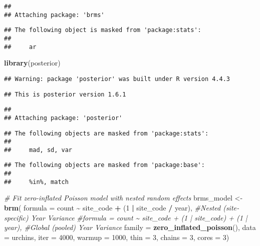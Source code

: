 \documentclass[
]{article}
\newenvironment{Shaded}{\begin{snugshade}}{\end{snugshade}}
\newcommand{\AttributeTok}[1]{\textcolor[rgb]{0.13,0.29,0.53}{#1}}
\newcommand{\CommentTok}[1]{\textcolor[rgb]{0.56,0.35,0.01}{\textit{#1}}}
\newcommand{\DecValTok}[1]{\textcolor[rgb]{0.00,0.00,0.81}{#1}}
\newcommand{\FunctionTok}[1]{\textcolor[rgb]{0.13,0.29,0.53}{\textbf{#1}}}
\newcommand{\NormalTok}[1]{#1}
\newcommand{\OtherTok}[1]{\textcolor[rgb]{0.56,0.35,0.01}{#1}}
\newcommand{\SpecialCharTok}[1]{\textcolor[rgb]{0.81,0.36,0.00}{\textbf{#1}}}
\begin{document}
\begin{verbatim}
## 
## Attaching package: 'brms'
\end{verbatim}

\begin{verbatim}
## The following object is masked from 'package:stats':
## 
##     ar
\end{verbatim}

\begin{Shaded}
\begin{Highlighting}[]
\FunctionTok{library}\NormalTok{(posterior)}
\end{Highlighting}
\end{Shaded}

\begin{verbatim}
## Warning: package 'posterior' was built under R version 4.4.3
\end{verbatim}

\begin{verbatim}
## This is posterior version 1.6.1
\end{verbatim}

\begin{verbatim}
## 
## Attaching package: 'posterior'
\end{verbatim}

\begin{verbatim}
## The following objects are masked from 'package:stats':
## 
##     mad, sd, var
\end{verbatim}

\begin{verbatim}
## The following objects are masked from 'package:base':
## 
##     %in%, match
\end{verbatim}

\begin{Shaded}
\begin{Highlighting}[]
\CommentTok{\# Fit zero{-}inflated Poisson model with nested random effects}
\NormalTok{brms\_model }\OtherTok{\textless{}{-}} \FunctionTok{brm}\NormalTok{(}
  \AttributeTok{formula =}\NormalTok{ count }\SpecialCharTok{\textasciitilde{}}\NormalTok{ site\_code }\SpecialCharTok{+}\NormalTok{ (}\DecValTok{1} \SpecialCharTok{|}\NormalTok{ site\_code }\SpecialCharTok{/}\NormalTok{ year), }\CommentTok{\#Nested (site‐specific) Year Variance}
  \CommentTok{\#formula = count \textasciitilde{} site\_code + (1 | site\_code) + (1 | year), \#Global (pooled) Year Variance}
  \AttributeTok{family  =} \FunctionTok{zero\_inflated\_poisson}\NormalTok{(),}
  \AttributeTok{data    =}\NormalTok{ urchins,}
  \AttributeTok{iter    =} \DecValTok{4000}\NormalTok{,}
  \AttributeTok{warmup  =} \DecValTok{1000}\NormalTok{,}
  \AttributeTok{thin    =} \DecValTok{3}\NormalTok{,}
  \AttributeTok{chains  =} \DecValTok{3}\NormalTok{,}
  \AttributeTok{cores   =} \DecValTok{3}\NormalTok{)}
\end{Highlighting}
\end{Shaded}
\end{document}
